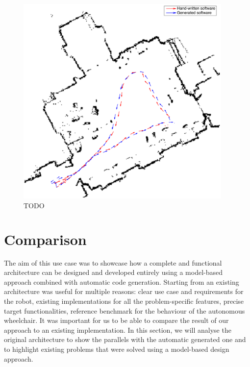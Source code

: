 \begin{figure}[t]
\centering
\includegraphics[width=0.95\textwidth]{gfx/pmk/path-followed}
\caption{TODO}
\label{fig:path}
\end{figure}

\section{Comparison}
The aim of this use case was to showcase how a complete and functional architecture can be designed and developed entirely using a model-based approach combined with automatic code generation. Starting from an existing architecture was useful for multiple reasons: clear use case and requirements for the robot, existing implementations for all the problem-specific features, precise target functionalities, reference benchmark for the behaviour of the autonomous wheelchair. It was important for us to be able to compare the result of our approach to an existing implementation. In this section, we will analyse the original architecture to show the parallels with the automatic generated one and to highlight existing problems that were solved using a model-based design approach.

